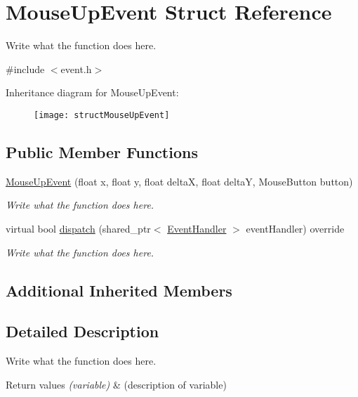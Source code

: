 \hypertarget{structMouseUpEvent}{\section{Mouse\+Up\+Event Struct Reference}
\label{structMouseUpEvent}
}


Write what the function does here.  




{\ttfamily \#include $<$event.\+h$>$}

Inheritance diagram for Mouse\+Up\+Event\+:\begin{figure}[H]
\begin{center}
\leavevmode
\texttt{[image: structMouseUpEvent]}
\end{center}
\end{figure}
\subsection*{Public Member Functions}
\begin{DoxyCompactItemize}
\item 
\hyperlink{structMouseUpEvent_ac1395cedfc2ab584976e41450cbdeab9}{Mouse\+Up\+Event} (float x, float y, float delta\+X, float delta\+Y, Mouse\+Button button)
\begin{DoxyCompactList}\small\item\em Write what the function does here. \end{DoxyCompactList}\item 
virtual bool \hyperlink{structMouseUpEvent_a013d0f9ff763239e909347e7624bfa04}{dispatch} (shared\+\_\+ptr$<$ \hyperlink{structEventHandler}{Event\+Handler} $>$ event\+Handler) override
\begin{DoxyCompactList}\small\item\em Write what the function does here. \end{DoxyCompactList}\end{DoxyCompactItemize}
\subsection*{Additional Inherited Members}


\subsection{Detailed Description}
Write what the function does here. 


\begin{DoxyRetVals}{Return values}
{\em (variable)} & (description of variable) \\
\hline
\end{DoxyRetVals}


